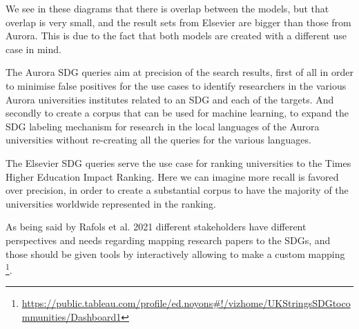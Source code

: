 \documentclass{article}
\begin{document}
We see in these diagrams that there is overlap between the models, but that overlap is very small, and the result sets from Elsevier are bigger than those from Aurora. This is due to the fact that both models are created with a different use case in mind.

The Aurora SDG queries aim at precision of the search results, first of all in order to minimise false positives for the use cases to identify researchers in the various Aurora universities institutes related to an SDG and each of the targets. And secondly to create a corpus that can be used for machine learning, to expand the SDG labeling mechanism for research in the local languages of the Aurora universities without re-creating all the queries for the various languages.

The Elsevier SDG queries serve the use case for ranking universities to the Times Higher Education Impact Ranking. Here we can imagine more recall is favored over precision, in order to create a substantial corpus to have the majority of the universities worldwide represented in the ranking.

As being said by Rafols et al. 2021 \cite{rafols_visualising_2021} different stakeholders have different perspectives and needs regarding mapping research papers to the SDGs, and those should be given tools by interactively allowing to make a custom mapping \footnote{\url{https://public.tableau.com/profile/ed.noyons\#!/vizhome/UKStringsSDGtocommunities/Dashboard1}}.

\end{document}
